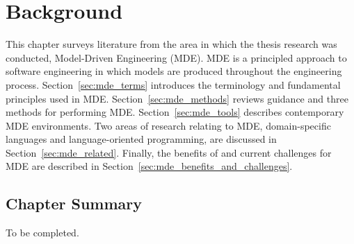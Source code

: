 
\chapter{Background}
\label{Background}
This chapter surveys literature from the area in which the thesis research was conducted, Model-Driven Engineering (MDE). MDE is a principled approach to software engineering in which models are produced throughout the engineering process. Section~\ref{sec:mde_terms} introduces the terminology and fundamental principles used in MDE. Section~\ref{sec:mde_methods} reviews guidance and three methods for performing MDE. Section~\ref{sec:mde_tools} describes contemporary MDE environments. Two areas of research relating to MDE, domain-specific languages and language-oriented programming, are discussed in Section~\ref{sec:mde_related}. Finally, the benefits of and current challenges for MDE are described in Section~\ref{sec:mde_benefits_and_challenges}.







\section{Chapter Summary}
To be completed.